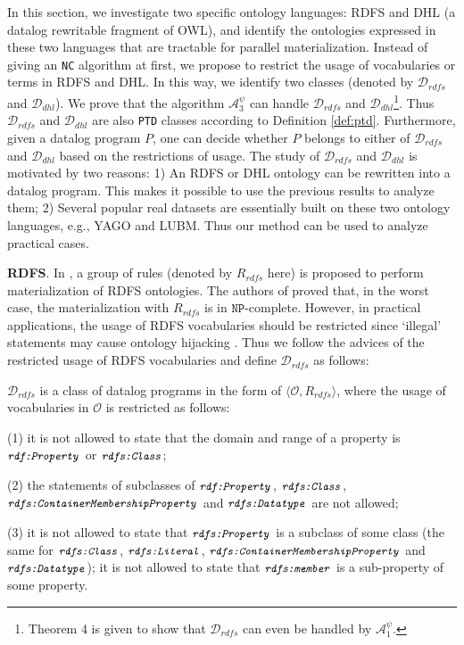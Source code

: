 \documentclass{article}
\begin{document}
In this section, we investigate two specific ontology languages: RDFS and DHL (a datalog rewritable fragment of OWL),
and identify the ontologies expressed in these two languages that are tractable for parallel materialization. Instead
of giving an \texttt{NC} algorithm at first, we propose to restrict the usage of vocabularies or terms in RDFS and DHL. In this way, we identify two classes (denoted by $\mathcal{D}_{rdfs}$ and $\mathcal{D}_{dhl}$). We prove that the algorithm $\mathcal{A}_3^{\psi}$ can handle $\mathcal{D}_{rdfs}$ and $\mathcal{D}_{dhl}$\footnote{Theorem 4 is given to show that $\mathcal{D}_{rdfs}$ can even be handled by $\mathcal{A}_1^{\psi}$.}. Thus $\mathcal{D}_{rdfs}$ and $\mathcal{D}_{dhl}$ are also \texttt{PTD} classes according to Definition \ref{def:ptd}. Furthermore, given a
datalog program $P$, one can decide whether $P$ belongs to either of $\mathcal{D}_{rdfs}$ and $\mathcal{D}_{dhl}$ based on
the restrictions of usage. The study of $\mathcal{D}_{rdfs}$ and $\mathcal{D}_{dhl}$ is motivated by two reasons: 1) An RDFS or DHL ontology can be rewritten into a datalog program. This makes it possible to use the previous results to analyze them; 2) Several popular real datasets are essentially
built on these two ontology languages, e.g., YAGO and LUBM. Thus our method can be used to analyze practical cases.

\textbf{RDFS}. In \cite{rdfSemantic},
a group of rules (denoted by $R_{rdfs}$ here) is proposed to perform materialization of RDFS ontologies.
The authors of \cite{DBLP:journals/ws/Horst05}
proved that, in the worst case, the materialization with $R_{rdfs}$ is in $\texttt{NP}$-complete. However, in practical applications, the usage of RDFS vocabularies should be restricted since `illegal' statements may cause ontology
hijacking \cite{DBLP:journals/ijswis/HoganHP09}. Thus we follow the advices \cite{DBLP:journals/ijswis/HoganHP09}
of the restricted usage of RDFS vocabularies and
define $\mathcal{D}_{rdfs}$ as follows:

\begin{definition}\label{def:drdfs} $\mathcal{D}_{rdfs}$ is a class of datalog programs in the form
of $\langle\mathcal{O}, R_{rdfs}\rangle$, where the usage of vocabularies
in $\mathcal{O}$ is restricted as follows:

(1) it is not allowed to state that the domain and range of a property is $\small\texttt{\emph{rdf:Property}}$
or $\small\texttt{\emph{rdfs:Class}}$;

(2) the statements of subclasses of $\small\texttt{\emph{rdf:Property}}$,
$\small\texttt{\emph{rdfs:Class}}$, $\small\texttt{\emph{rdfs:ContainerMembershipProperty}}$
and $\small\texttt{\emph{rdfs:Datatype}}$ are not allowed;

(3) it is not allowed to state that $\small\texttt{\emph{rdfs:Property}}$ is a subclass of some class
(the same for $\small\texttt{\emph{rdfs:Class}}$, $\small\texttt{\emph{rdfs:Literal}}$, $\small\texttt{\emph{rdfs:ContainerMembershipProperty}}$ and $\small\texttt{\emph{rdfs:Datatype}}$);
it is not allowed to state that $\small\texttt{\emph{rdfs:member}}$ is a sub-property of some property.
\end{definition}
\end{document}
